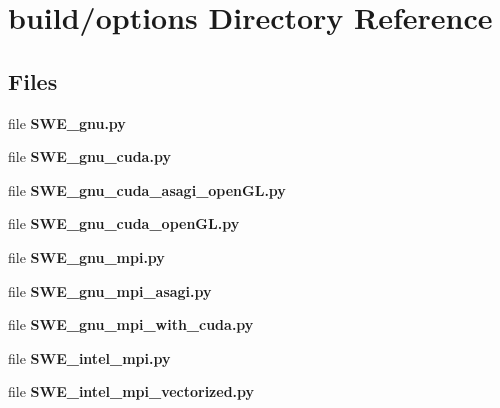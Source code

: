 \section{build/options Directory Reference}
\label{dir_2757dcf6280192d9877141bce2daf10f}
\subsection*{Files}
\begin{DoxyCompactItemize}
\item 
file {\bfseries S\-W\-E\-\_\-gnu.\-py}
\item 
file {\bfseries S\-W\-E\-\_\-gnu\-\_\-cuda.\-py}
\item 
file {\bfseries S\-W\-E\-\_\-gnu\-\_\-cuda\-\_\-asagi\-\_\-open\-G\-L.\-py}
\item 
file {\bfseries S\-W\-E\-\_\-gnu\-\_\-cuda\-\_\-open\-G\-L.\-py}
\item 
file {\bfseries S\-W\-E\-\_\-gnu\-\_\-mpi.\-py}
\item 
file {\bfseries S\-W\-E\-\_\-gnu\-\_\-mpi\-\_\-asagi.\-py}
\item 
file {\bfseries S\-W\-E\-\_\-gnu\-\_\-mpi\-\_\-with\-\_\-cuda.\-py}
\item 
file {\bfseries S\-W\-E\-\_\-intel\-\_\-mpi.\-py}
\item 
file {\bfseries S\-W\-E\-\_\-intel\-\_\-mpi\-\_\-vectorized.\-py}
\end{DoxyCompactItemize}
